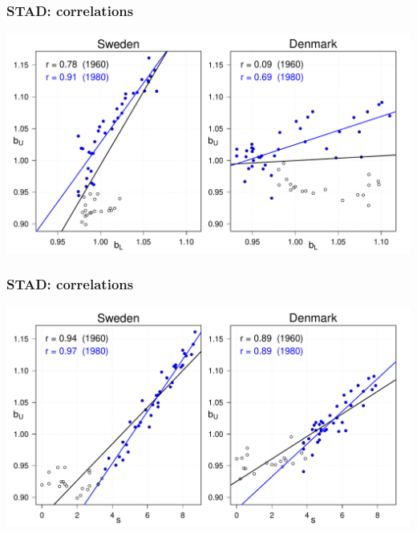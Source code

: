 \documentclass[12pt, xcolor=table]{beamer}  %
\begin{document}
\begin{frame}[noframenumbering]\frametitle{STAD: correlations}

\vspace{-0.5cm}
	
	
	\begin{center}	
		\vspace{0.2cm}
		
		\includegraphics[scale=.42]{Figures/Ch2/F_CORR_B}
		
	\end{center}
	
\end{frame}

\begin{frame}[noframenumbering]\frametitle{STAD: correlations}

\vspace{-0.5cm}
	
	
	\begin{center}	
		\vspace{0.2cm}
		
		\includegraphics[scale=.42]{Figures/Ch2/F_CORR_S}
		
	\end{center}
	
\end{frame}
\end{document}
